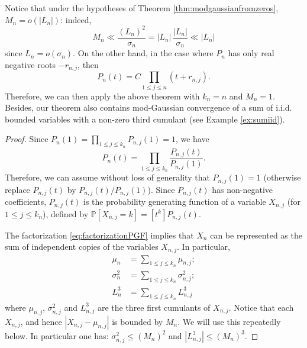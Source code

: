 \documentclass[12pt,a4paper,reqno]{amsart}
\theoremstyle{remark}
\newcommand{\proba}{\mathbb{P}}
\begin{document}
\noindent Notice that under the hypotheses of Theorem \ref{thm:modgaussianfromzeros}, $M_n = o(|L_n|)$: indeed,
$$M_n \ll \frac{(L_n)^2}{\sigma_n} = |L_n|\, \frac{|L_n|}{\sigma_n} \ll |L_n| $$
since $L_n  = o(\sigma_n)$. On the other hand, in the case where $P_n$ has only real negative roots $-r_{n,j}$, then 
\[P_n(t)= C \prod_{1 \le j \le n} (t+r_{n,j}).\] Therefore, we can then apply the above theorem with $k_n=n$ and $M_n=1$. Besides, our theorem also contains mod-Gaussian convergence of a sum of i.i.d. bounded variables with a non-zero third cumulant (see Example \ref{ex:sumiid}).

\begin{proof}
Since $P_n(1)= \prod_{1 \le j \le k_n} P_{n,j}(1)=1$, we have
    \[P_n(t) = \prod_{1 \le j \le k_n} \frac{P_{n,j}(t)}{P_{n,j}(1)}. \]
Therefore, we can assume without loss of generality that $P_{n,j}(1)=1$ (otherwise replace $P_{n,j}(t)$ by $P_{n,j}(t)/P_{n,j}(1)$). Since $P_{n,j}(t)$ has non-negative coefficients, $P_{n,j}(t)$ is the probability generating function of a variable $X_{n,j}$ (for $1 \le j \le k_n$), defined by $\proba[X_{n,j}=k]=[t^k] P_{n,j}(t)$.
\bigskip

The factorization \eqref{eq:factorizationPGF} implies that $X_n$ can be represented as the sum of independent copies of the variables $X_{n,j}$. In particular, 
\begin{align*}
\mu_n&=\sum_{1 \le j \le k_n} \mu_{n,j};\\
\sigma_n^2&=\sum_{1 \le j \le k_n} \sigma_{n,j}^2; \\
L_n^3&= \sum_{1 \le j \le k_n} L_{n,j}^3
\end{align*}
where $\mu_{n,j}$, $\sigma_{n,j}^2$ and $L_{n,j}^3$ are the three first cumulants of $X_{n,j}$. Notice that each $X_{n,j}$, and hence $|X_{n,j}-\mu_{n,j}|$ is bounded by $M_n$. We will use this repeatedly below. In particular one has: $\sigma_{n,j}^2 \le (M_n)^2$ and $|L_{n,j}^3| \le (M_n)^3$.
\bigskip


\end{proof}
\end{document}
